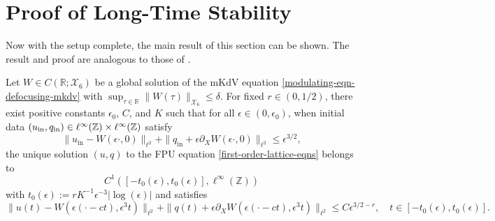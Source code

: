 \section{Proof of Long-Time Stability}

Now with the setup complete, the main result of this section can be shown. The result and proof are analogous to those of \cite[Thm.~1]{khan2017long}.

\begin{theorem}
	Let \(W \in C(\mathbb R; \mathcal X_6)\) be a global solution of the mKdV equation \cref{modulating-eqn-defocusing-mkdv} with \(\sup_{\tau\in \mathbb R} \| W(\tau)\|_{\mathcal X_6} \leq \delta\). For fixed \(r\in (0,1/2)\), there exist positive constants \(\epsilon_0\), \(C\), and \(K\) such that for all \(\epsilon \in (0,\epsilon_0)\), when initial data \((u_{\mathrm{in}}, q _{\mathrm{in}}) \in \ell^\infty(\mathbb{Z})\times \ell^\infty(\mathbb{Z})\) satisfy 
	\begin{equation}\label{initial-conditions}
		\|u_{\mathrm{in}} - W(\epsilon \cdot, 0) \|_{\ell^2} + \| q _{\mathrm{in}} + \epsilon \partial_XW(\epsilon \cdot, 0) \|_{\ell^2} \leq \epsilon^{3/2},
	\end{equation}
	the unique solution \((u,q)\) to the FPU equation \cref{first-order-lattice-eqns} belongs to 
	\begin{equation}
		C^1([-t_0(\epsilon), t_0(\epsilon)], \ell^\infty(\mathbb Z))
	\end{equation}
	with \(t_0(\epsilon):= r K^{-1} \epsilon^{-3} | \log (\epsilon) | \) and satisfies
	\begin{equation}
		\| u(t) - W(\epsilon(\cdot -ct), \epsilon^3 t) \|_{\ell^2} + \| q(t) + \epsilon \partial_X W(\epsilon (\cdot - ct), \epsilon^3 t) \|_{\ell^2} \leq C \epsilon^{3/2 - r}, \quad t\in[-t_0(\epsilon), t_0(\epsilon)].
	\end{equation}
\end{theorem}

